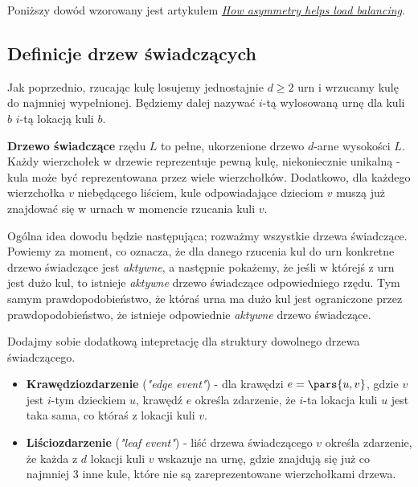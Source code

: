 Poniższy dowód wzorowany jest artykułem \href{https://dl.acm.org/doi/10.1145/792538.792546}{\textit{How asymmetry helps load balancing}}.

\subsection*{Definicje drzew świadczących}

Jak poprzednio, rzucając kulę losujemy jednostajnie \(d \geq 2\) urn i wrzucamy kulę do najmniej wypełnionej. Będziemy dalej nazywać \(i\)-tą wylosowaną urnę dla kuli \(b\) \(i\)-tą lokacją kuli \(b\).

\begin{definition}
	\textbf{Drzewo świadczące} rzędu \(L\) to pełne, ukorzenione drzewo \(d\)-arne wysokości \(L\).
	Każdy wierzchołek w drzewie reprezentuje pewną kulę, niekoniecznie unikalną - kula może być reprezentowana przez wiele wierzchołków.
	Dodatkowo, dla każdego wierzchołka \(v\) niebędącego liściem, kule odpowiadające dzieciom \(v\) muszą już znajdować się w urnach w momencie rzucania kuli \(v\).
\end{definition}

Ogólna idea dowodu będzie następująca; rozważmy wszystkie drzewa świadczące.
Powiemy za moment, co oznacza, że dla danego rzucenia kul do urn konkretne drzewo świadczące jest \textit{aktywne}, a następnie pokażemy, że jeśli w którejś z urn jest dużo kul, to istnieje \textit{aktywne} drzewo świadczące odpowiedniego rzędu.
Tym samym prawdopodobieństwo, że któraś urna ma dużo kul jest ograniczone przez prawdopodobieństwo, że istnieje odpowiednie \textit{aktywne} drzewo świadczące.

\begin{definition}
	Dodajmy sobie dodatkową intepretację dla struktury dowolnego drzewa świadczącego.

	\begin{itemize}
		\item \textbf{Krawędziozdarzenie} (\textit{"edge event"}) - dla krawędzi \(e = \pars{u, v}\), gdzie \(v\) jest \(i\)-tym dzieckiem \(u\),
		      krawędź \(e\) określa zdarzenie, że \(i\)-ta lokacja kuli \(u\) jest taka sama, co któraś z lokacji kuli \(v\).
		\item \textbf{Liściozdarzenie} (\textit{"leaf event"}) - liść drzewa świadczącego \(v\) określa zdarzenie, że każda z \(d\) lokacji kuli \(v\) wskazuje na urnę, gdzie znajdują się już co najmniej 3 inne kule, które nie są zareprezentowane wierzchołkami drzewa.
	\end{itemize}
\end{definition}

